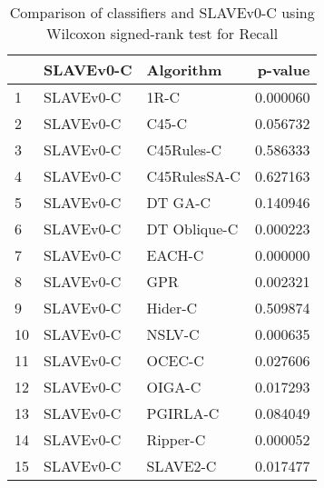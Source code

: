 \begin{table}
\footnotesize
\caption{Comparison of classifiers and SLAVEv0-C using Wilcoxon signed-rank test for Recall}
\label{tab:SLAVEv0-C wilcoxon Recall comparison}
\begin{tabular}{lllr}
\hline
 & SLAVEv0-C & Algorithm & p-value \\
\hline
1 & SLAVEv0-C & 1R-C & 0.000060 \\
2 & SLAVEv0-C & C45-C & 0.056732 \\
3 & SLAVEv0-C & C45Rules-C & 0.586333 \\
4 & SLAVEv0-C & C45RulesSA-C & 0.627163 \\
5 & SLAVEv0-C & DT GA-C & 0.140946 \\
6 & SLAVEv0-C & DT Oblique-C & 0.000223 \\
7 & SLAVEv0-C & EACH-C & 0.000000 \\
8 & SLAVEv0-C & GPR & 0.002321 \\
9 & SLAVEv0-C & Hider-C & 0.509874 \\
10 & SLAVEv0-C & NSLV-C & 0.000635 \\
11 & SLAVEv0-C & OCEC-C & 0.027606 \\
12 & SLAVEv0-C & OIGA-C & 0.017293 \\
13 & SLAVEv0-C & PGIRLA-C & 0.084049 \\
14 & SLAVEv0-C & Ripper-C & 0.000052 \\
15 & SLAVEv0-C & SLAVE2-C & 0.017477 \\
\hline
\end{tabular}
\end{table}
